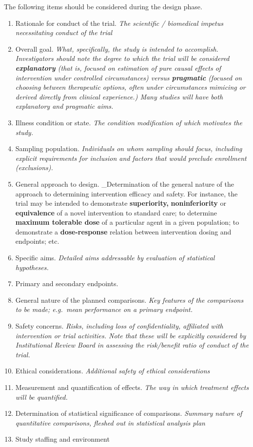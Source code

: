 \documentclass[]{book}
\providecommand{\tightlist}{%
  \setlength{\itemsep}{0pt}\setlength{\parskip}{0pt}}
\begin{document}
The following items should be considered during the design phase.

\begin{enumerate}
\def\labelenumi{\arabic{enumi}.}
\tightlist
\item
  Rationale for conduct of the trial. \emph{The scientific / biomedical
  impetus necessitating conduct of the trial}
\item
  Overall goal. \emph{What, specifically, the study is intended to
  accomplish. Investigators should note the degree to which the trial
  will be considered \textbf{explanatory} (that is, focused on
  estimation of pure causal effects of intervention under controlled
  circumstances) versus \textbf{pragmatic} (focused on choosing between
  therapeutic options, often under circumstances mimicing or derived
  directly from clinical experience.) Many studies will have both
  explanatory and pragmatic aims.}
\item
  Illness condition or state. \emph{The condition modification of which
  motivates the study.}
\item
  Sampling population. \emph{Individuals on whom sampling should focus,
  including explicit requirements for inclusion and factors that would
  preclude enrollment (exclusions).}
\item
  General approach to design. \_Determination of the general nature of
  the approach to determining intervention efficacy and safety. For
  instance, the trial may be intended to demonstrate
  \textbf{superiority,} \textbf{noninferiority} or \textbf{equivalence}
  of a novel intervention to standard care; to determine \textbf{maximum
  tolerable dose} of a particular agent in a given population; to
  demonstrate a \textbf{dose-response} relation between intervention
  dosing and endpoints; etc.
\item
  Specific aims. \emph{Detailed aims addressable by evaluation of
  statistical hypotheses.}
\item
  Primary and secondary endpoints.
\item
  General nature of the planned comparisons. \emph{Key features of the
  comparisons to be made; e.g.~mean performance on a primary endpoint.}
\item
  Safety concerns. \emph{Risks, including loss of confidentiality,
  affiliated with intervention or trial activities. Note that these will
  be explicitly considered by Institutional Review Board in assessing
  the risk/benefit ratio of conduct of the trial.}
\item
  Ethical considerations. \emph{Additional safety of ethical
  considerations}
\item
  Measurement and quantification of effects. \emph{The way in which
  treatment effects will be quantified.}
\item
  Determination of statistical significance of comparisons.
  \emph{Summary nature of quantitative comparisons, fleshed out in
  statistical analysis plan}
\item
  Study staffing and environment


\end{enumerate}
\end{document}
